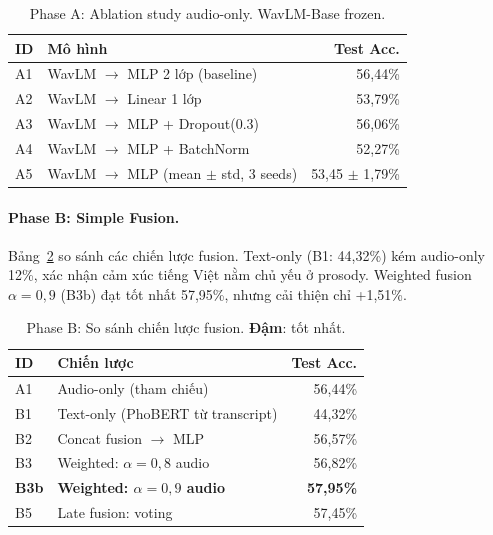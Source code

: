\documentclass[runningheads]{llncs}
\begin{document}
\begin{table}[H]
\centering
\caption{Phase A: Ablation study audio-only. WavLM-Base frozen.}
\label{tab:phase_a}
\begin{tabular}{@{}llr@{}}
\toprule
\textbf{ID} & \textbf{Mô hình} & \textbf{Test Acc.} \\
\midrule
A1 & WavLM $\to$ MLP 2 lớp (baseline)           & 56,44\% \\
A2 & WavLM $\to$ Linear 1 lớp                    & 53,79\% \\
A3 & WavLM $\to$ MLP + Dropout(0.3)              & 56,06\% \\
A4 & WavLM $\to$ MLP + BatchNorm                 & 52,27\% \\
A5 & WavLM $\to$ MLP (mean $\pm$ std, 3 seeds)   & 53,45 $\pm$ 1,79\% \\
\bottomrule
\end{tabular}
\end{table}

\paragraph{Phase B: Simple Fusion.}
Bảng~\ref{tab:phase_b} so sánh các chiến lược fusion.
Text-only (B1: 44,32\%) kém audio-only 12\%, xác nhận cảm xúc tiếng Việt
nằm chủ yếu ở prosody.
Weighted fusion $\alpha{=}0{,}9$ (B3b) đạt tốt nhất 57,95\%, nhưng cải
thiện chỉ +1,51\%.

\begin{table}[H]
\centering
\caption{Phase B: So sánh chiến lược fusion. \textbf{Đậm}: tốt nhất.}
\label{tab:phase_b}
\begin{tabular}{@{}llr@{}}
\toprule
\textbf{ID} & \textbf{Chiến lược} & \textbf{Test Acc.} \\
\midrule
A1  & Audio-only (tham chiếu)                     & 56,44\% \\
B1  & Text-only (PhoBERT từ transcript)            & 44,32\% \\
B2  & Concat fusion $\to$ MLP                      & 56,57\% \\
B3  & Weighted: $\alpha{=}0{,}8$ audio             & 56,82\% \\
\textbf{B3b} & \textbf{Weighted: $\alpha{=}0{,}9$ audio} & \textbf{57,95\%} \\
B5  & Late fusion: voting                          & 57,45\% \\
\bottomrule
\end{tabular}
\end{table}
\end{document}
